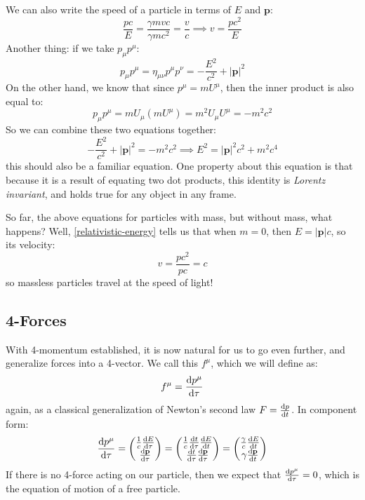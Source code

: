 We can also write the speed of a particle in terms of \( E \) and \( \mathbf{p} \):
\[
	\frac{pc}{E} = \frac{\gamma mv c}{\gamma mc^2} = \frac{v}{c} \implies v = \frac{pc^2}{E}
\]
Another thing: if we take \( p_{\mu}p^{\mu} \):
\[
	p_{\mu}p^{\mu} = \eta_{\mu \nu}p^{\mu}p^{\nu} = -\frac{E^2}{c^2} + |\mathbf{p}|^2
\]
On the other hand, we know that since \( p^{\mu} = m U^{\mu} \), then the inner product is also equal to:
\[
	p_{\mu}p^{\mu} = m U_{\mu}(m U^{\mu}) = m^2 U_{\mu}U^{\mu} = -m^2 c^2
\]	
So we can combine these two equations together:
\begin{equation}
	\label{relativistic-energy}
	-\frac{E^2}{c^2} + |\mathbf{p}|^2 = -m^2 c^2 \implies E^2 = |\mathbf{p}|^2 c^2 + m^2 c^{4}
\end{equation}
this should also be a familiar equation. One property about this equation is that because it is a result of
equating two dot products, this identity is \textit{Lorentz invariant}, and holds true for any object in any
frame. 

So far, the above equations for particles with mass, but without mass, what happens? Well,
\cref{relativistic-energy} tells us that when \( m = 0 \), then \( E = |\mathbf{p}|c \), so its velocity:
\[
	v = \frac{pc^2}{pc} = c
\]
so massless particles travel at the speed of light!   

\subsection{4-Forces}
With 4-momentum established, it is now natural for us to go even further, and generalize forces into a
4-vector. We call this \( f^{\mu} \), which we will define as:
\[
	f^{\mu} = \dv{p^{\mu}}{\tau}
\]
again, as a classical generalization of Newton's second law \( F = \dv{p}{t} \). In component form:
\[
	\dv{p^{\mu}}{\tau} = \begin{pmatrix} \frac{1}{c} \dv{E}{\tau} \\ \dv{\mathbf{p}}{\tau} \end{pmatrix} =
\begin{pmatrix} \frac{1}{c} \dv{t}{\tau} \dv{E}{t} \\ \dv{t}{\tau} \dv{\mathbf{p}}{\tau} \end{pmatrix} = 
\begin{pmatrix} \frac{\gamma}{c} \dv{E}{t} \\ \gamma \dv{\mathbf{p}}{t} \end{pmatrix}
\]
If there is no 4-force acting on our particle, then we expect that \( \dv{p^{\mu}}{\tau} = 0 \), which is the
equation of motion of a free particle.


